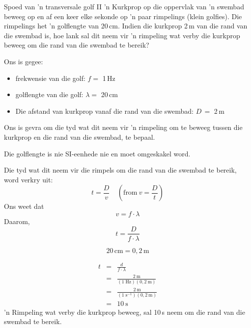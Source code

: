 \begin{wex}{Spoed van 'n transversale golf II}{ 'n Kurkprop op die oppervlak van 'n swembad beweeg op en af ​​een keer elke sekonde op
     'n paar rimpelings (klein golfies). Die rimpelings het 'n golflengte van  20\,cm. Indien die kurkprop 2\,m van die
    rand van die swembad is, hoe lank sal dit neem vir  'n rimpeling wat verby die kurkprop beweeg om die rand
    van die swembad te bereik?}{
Ons is gegee:
\begin{itemize}
\item{frekwensie van die golf: $f =$ 1\,Hz}
\item{golflengte van die golf: $\lambda =$ 20\,cm}
\item{Die afstand van kurkprop vanaf die rand van die swembad:  $D\,=$ 2\,m}
\end{itemize}
Ons is gevra om die tyd wat dit neem vir 'n rimpeling om te beweeg tussen die kurkprop
    en die rand van die swembad, te bepaal.

 Die golflengte is nie SI-eenhede nie en moet omgeskakel word.

Die tyd wat dit neem vir die rimpels om die rand van die swembad te bereik, word verkry uit:
$$t=\frac{D}{v} \ \ \ \ \ (\text{from}\ v=\frac{D}{t})$$
Ons weet dat
\begin{equation*}v=f\cdot \lambda\end{equation*}
Daarom,
\begin{equation}t=\frac{D}{f\cdot \lambda}\end{equation}

\begin{equation*}20\,\text{cm}=0,2\,\text{m}\end{equation*}

\begin{eqnarray*}
t&=&\frac{d}{f\cdot \lambda}\\
&=&\frac{2~\text{m}}{(1\;\text{Hz})(0,2~\text{m})}\\
&=&\frac{2~\text{m}}{(1\;\text{s}^{-1})(0,2~\text{m})}\\
&=&10\ \text{s}
\end{eqnarray*}
 'n Rimpeling wat verby die kurkprop beweeg, sal 10\,s neem om die rand van die swembad te bereik.}
\end{wex}

